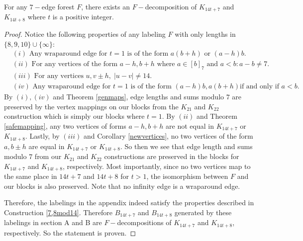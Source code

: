 \begin{thm}
    For any $7-$edge forest $F$, there exists an $F-$decomposition of $K_{14t+7}$ and $K_{14t+8}$ where $t$ is a positive integer.

    \begin{proof}
        Notice the following properties of any labeling $F$ with only lengths in $\{8,9,10\}\cup \{\infty\}$:
        \begin{align*}
        &(i)\text{ Any wraparound edge for }t=1\text{ is of the form $a(b+h)$ or $(a-h)b$.}\\
        &(ii)\text{ For any vertices of the form }a-h,b+h\text{ where }a\in [b]_{7}\text{ and }a<b: a-b\neq 7.\\
        &(iii)\text{ For any vertices }u,v\pm h,\;|u-v|\neq 14.\\
        &(iv)\text{ Any wraparound edge for }t=1\text{ is of the form }(a-h)b,a(b+h)\text{if and only if }a<b.
        \end{align*}
        By $(i),(iv)$ and Theorem \ref{genmaps}, edge lengths and sums modulo $7$ are preserved by the vertex mappings on our blocks from the $K_{21}$ and $K_{22}$ construction which is simply our blocks where $t=1$. By $(ii)$ and Theorem \ref{safemapping}, any two vertices of forms $a-h,b+h$ are not equal in $K_{14t+7}$ or $K_{14t+8}$. Lastly, by $(iii)$ and Corollary \ref{newvertices}, no two vertices of the form $a,b\pm h$ are equal in $K_{14t+7}$ or $K_{14t+8}$. So then we see that edge length and sums modulo $7$ from our $K_{21}$ and $K_{22}$ constructions are preserved in the blocks for $K_{14t+7}$ and $K_{14t+8}$, respectively. Most importantly, since no two vertices map to the same place in $14t+7$ and $14t+8$ for $t>1$, the isomorphism between $F$ and our blocks is also preserved. Note that no infinity edge is a wraparound edge.

        Therefore, the labelings in the appendix indeed satisfy the properties described in Construction \ref{7,8mod14}. Therefore $B_{14t+7}$ and $B_{14t+8}$ generated by these labelings in section A and B are $F-$decompositions of $K_{14t+7}$ and $K_{14t+8}$, respectively. So the statement is proven.
    \end{proof}
\end{thm}